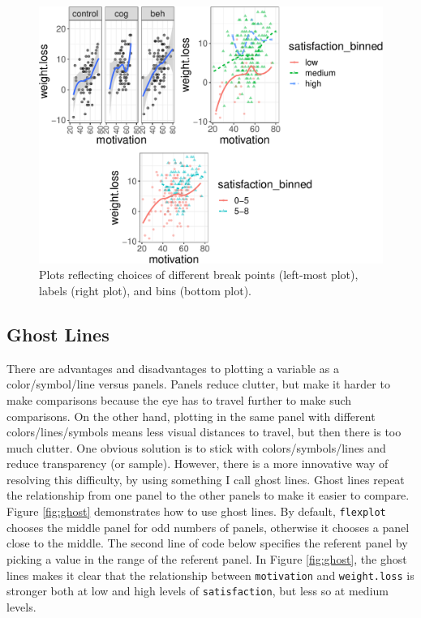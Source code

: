 \documentclass[
  man]{apa6}
\begin{document}
\normalsize

\small

\begin{figure}

{\centering \includegraphics[width=1\linewidth]{flexplot_psychmeth_files/figure-latex/panels2-1} 

}

\caption{Plots reflecting choices of different break points (left-most plot), labels (right plot), and bins (bottom plot). \label{fig:panels2}}\label{fig:panels2}
\end{figure}

\normalsize

\hypertarget{ghost-lines}{%
\subsection{Ghost Lines}\label{ghost-lines}}

There are advantages and disadvantages to plotting a variable as a color/symbol/line versus panels. Panels reduce clutter, but make it harder to make comparisons because the eye has to travel further to make such comparisons. On the other hand, plotting in the same panel with different colors/lines/symbols means less visual distances to travel, but then there is too much clutter. One obvious solution is to stick with colors/symbols/lines and reduce transparency (or sample). However, there is a more innovative way of resolving this difficulty, by using something I call ghost lines. Ghost lines repeat the relationship from one panel to the other panels to make it easier to compare. Figure \ref{fig:ghost} demonstrates how to use ghost lines. By default, \texttt{flexplot} chooses the middle panel for odd numbers of panels, otherwise it chooses a panel close to the middle. The second line of code below specifies the referent panel by picking a value in the range of the referent panel. In Figure \ref{fig:ghost}, the ghost lines makes it clear that the relationship between \texttt{motivation} and \texttt{weight.loss} is stronger both at low and high levels of \texttt{satisfaction}, but less so at medium levels.
\end{document}
